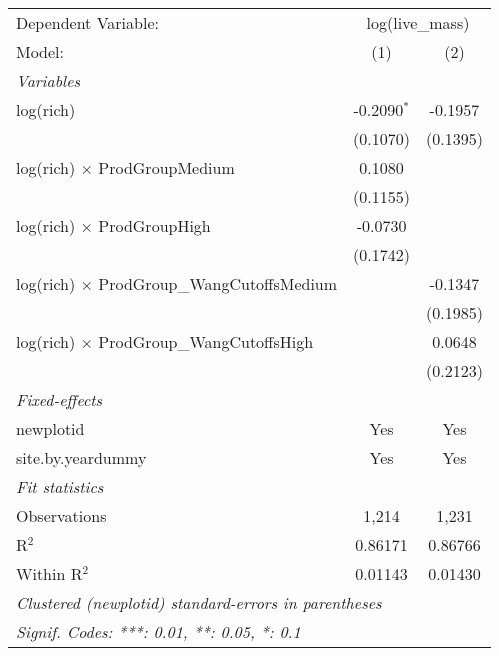 \begin{tabular}{lcc}
\tabularnewline\midrule\midrule
Dependent Variable:&\multicolumn{2}{c}{log(live\_mass)}\\
Model:&(1) & (2)\\
\midrule \emph{Variables}&   &  \\
log(rich) & -0.2090$^{*}$ & -0.1957\\
  &(0.1070) & (0.1395)\\
log(rich) $\times $ ProdGroupMedium & 0.1080 &   \\
  &(0.1155) &   \\
log(rich) $\times $ ProdGroupHigh & -0.0730 &   \\
  &(0.1742) &   \\
log(rich) $\times $ ProdGroup\_WangCutoffsMedium &    & -0.1347\\
  &   & (0.1985)\\
log(rich) $\times $ ProdGroup\_WangCutoffsHigh &    & 0.0648\\
  &   & (0.2123)\\
\midrule \emph{Fixed-effects}&   &  \\
newplotid & Yes & Yes\\
site.by.yeardummy & Yes & Yes\\
\midrule \emph{Fit statistics}&  & \\
Observations & 1,214&1,231\\
R$^2$ & 0.86171&0.86766\\
Within R$^2$ & 0.01143&0.01430\\
\midrule\midrule\multicolumn{3}{l}{\emph{Clustered (newplotid) standard-errors in parentheses}}\\
\multicolumn{3}{l}{\emph{Signif. Codes: ***: 0.01, **: 0.05, *: 0.1}}\\
\end{tabular}


